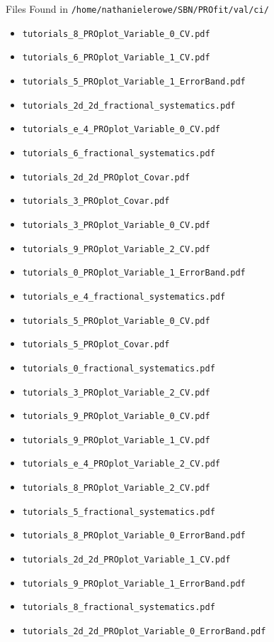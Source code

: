 \documentclass{beamer}
\begin{document}
\begin{frame}{Files Found in \texttt{/home/nathanielerowe/SBN/PROfit/val/ci/}}
\begin{itemize}
    \item \texttt{tutorials\_8\_PROplot\_Variable\_0\_CV.pdf}
    \item \texttt{tutorials\_6\_PROplot\_Variable\_1\_CV.pdf}
    \item \texttt{tutorials\_5\_PROplot\_Variable\_1\_ErrorBand.pdf}
    \item \texttt{tutorials\_2d\_2d\_fractional\_systematics.pdf}
    \item \texttt{tutorials\_e\_4\_PROplot\_Variable\_0\_CV.pdf}
    \item \texttt{tutorials\_6\_fractional\_systematics.pdf}
    \item \texttt{tutorials\_2d\_2d\_PROplot\_Covar.pdf}
    \item \texttt{tutorials\_3\_PROplot\_Covar.pdf}
    \item \texttt{tutorials\_3\_PROplot\_Variable\_0\_CV.pdf}
    \item \texttt{tutorials\_9\_PROplot\_Variable\_2\_CV.pdf}
    \item \texttt{tutorials\_0\_PROplot\_Variable\_1\_ErrorBand.pdf}
    \item \texttt{tutorials\_e\_4\_fractional\_systematics.pdf}
    \item \texttt{tutorials\_5\_PROplot\_Variable\_0\_CV.pdf}
    \item \texttt{tutorials\_5\_PROplot\_Covar.pdf}
    \item \texttt{tutorials\_0\_fractional\_systematics.pdf}
    \item \texttt{tutorials\_3\_PROplot\_Variable\_2\_CV.pdf}
    \item \texttt{tutorials\_9\_PROplot\_Variable\_0\_CV.pdf}
    \item \texttt{tutorials\_9\_PROplot\_Variable\_1\_CV.pdf}
    \item \texttt{tutorials\_e\_4\_PROplot\_Variable\_2\_CV.pdf}
    \item \texttt{tutorials\_8\_PROplot\_Variable\_2\_CV.pdf}
    \item \texttt{tutorials\_5\_fractional\_systematics.pdf}
    \item \texttt{tutorials\_8\_PROplot\_Variable\_0\_ErrorBand.pdf}
    \item \texttt{tutorials\_2d\_2d\_PROplot\_Variable\_1\_CV.pdf}
    \item \texttt{tutorials\_9\_PROplot\_Variable\_1\_ErrorBand.pdf}
    \item \texttt{tutorials\_8\_fractional\_systematics.pdf}
    \item \texttt{tutorials\_2d\_2d\_PROplot\_Variable\_0\_ErrorBand.pdf}

\end{itemize}
\end{frame}
\end{document}
